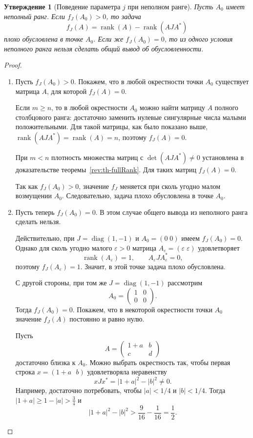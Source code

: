 \documentclass[a4paper,12pt]{article}
\DeclareMathOperator{\rank}{rank}
\DeclareMathOperator{\diag}{diag}
\theoremstyle{csstyle}
\newtheorem{proposition}[theorem]{Утверждение}
\begin{document}
\begin{proposition}[Поведение параметра $j$ при неполном ранге]\label{rev:prop-rank-deficient}
    Пусть $A_0$ имеет неполный ранг. Если $f_J(A_0)>0$, то задача
    \[
    f_J(A) = \rank(A)-\rank(AJA^*)
    \]
    плохо обусловлена в точке $A_0$. Если же $f_J(A_0)=0$, то из одного условия неполного ранга нельзя сделать общий вывод об обусловленности.
\end{proposition}
\begin{proof}
    \begin{enumerate}[label=\arabic*)]
    \item Пусть $f_J(A_0)>0$. Покажем, что в любой окрестности точки $A_0$ существует матрица $A$, для которой $f_J(A)=0$.
    
    Если $m\ge n$, то в любой окрестности $A_0$ можно найти матрицу $A$ полного столбцового ранга: достаточно заменить нулевые сингулярные числа малыми положительными. Для такой матрицы, как было показано выше, $\rank(AJA^*)=\rank(A)=n$, поэтому $f_J(A)=0$.
    
    При $m<n$ плотность множества матриц с $\det(AJA^*)\ne0$ установлена в доказательстве теоремы~\ref{rev:th-fullRank}. Для таких матриц $f_J(A)=0$.

    Так как $f_J(A_0)>0$, значение $f_J$ меняется при сколь угодно малом возмущении $A_0$. Следовательно, задача плохо обусловлена в точке $A_0$.

    \item Пусть теперь $f_J(A_0)=0$. В этом случае общего вывода из неполного ранга сделать нельзя.
    
    Действительно, при $J=\diag(1,-1)$ и $A_0=(0\;0)$ имеем $f_J(A_0)=0$. Однако для сколь угодно малого $\varepsilon>0$ матрица $A_\varepsilon=(\varepsilon\;\varepsilon)$ удовлетворяет
    \[
    \rank(A_\varepsilon)=1,\qquad A_\varepsilon J A_\varepsilon^*=0,
    \]
    поэтому $f_J(A_\varepsilon)=1$. Значит, в этой точке задача плохо обусловлена.
    
    С другой стороны, при том же $J=\diag(1,-1)$ рассмотрим
    \[
    A_0=
    \begin{pmatrix}
    1 & 0\\
    0 & 0
    \end{pmatrix}.
    \]
    Тогда $f_J(A_0)=0$. Покажем, что в некоторой окрестности точки $A_0$ значение $f_J(A)$ постоянно и равно нулю.
    
    Пусть
    \[
    A =
    \begin{pmatrix}
    1+a & b\\
    c & d
    \end{pmatrix}
    \]
    достаточно близка к $A_0$. Можно выбрать окрестность так, чтобы первая строка $x=(1+a\ \ \ b)$ удовлетворяла неравенству
    \[
    xJx^*=|1+a|^2-|b|^2\ne0.
    \]
    Например, достаточно потребовать, чтобы $|a|<1/4$ и $|b|<1/4$. Тогда $|1+a|\geq1-|a|>\frac{3}{4}$ и
    \[
    |1+a|^2-|b|^2>\frac{9}{16}-\frac{1}{16}=\frac12.
    \]
    

\end{enumerate}
\end{proof}
\end{document}
